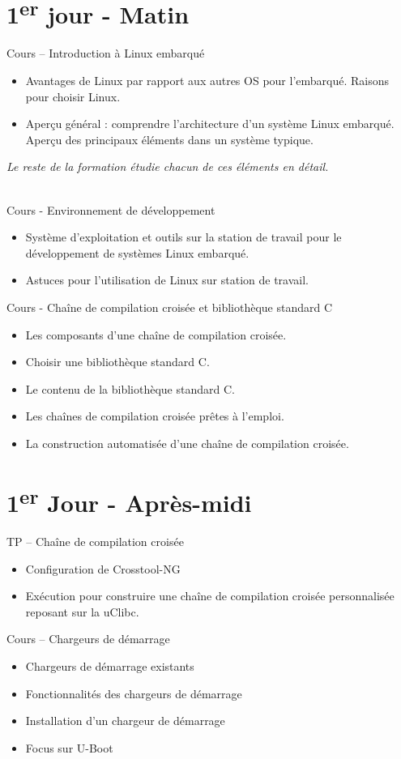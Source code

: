 \documentclass[a4paper,12pt,obeyspaces,spaces,hyphens]{article}
\begin{document}
\section{1\textsuperscript{er} jour - Matin}

\feagendaonecolumn
{Cours – Introduction à Linux embarqué}
{
  \begin{itemize}
  \item Avantages de Linux par rapport aux autres OS pour l'embarqué.
	Raisons pour choisir Linux.
  \item Aperçu général : comprendre l'architecture d'un système Linux
	embarqué. Aperçu des principaux éléments dans un système typique.
  \end{itemize}
  {\em Le reste de la formation étudie chacun de ces éléments en détail.}
}
\\
\feagendatwocolumn
{Cours - Environnement de développement}
{
  \begin{itemize}
  \item Système d'exploitation et outils sur la station de travail
	pour le développement de systèmes Linux embarqué.
  \item Astuces pour l'utilisation de Linux sur station de travail.
  \end{itemize}
}
{Cours - Chaîne de compilation croisée et bibliothèque standard C}
{
  \begin{itemize}
  \item Les composants d'une chaîne de compilation croisée.
  \item Choisir une bibliothèque standard C.
  \item Le contenu de la bibliothèque standard C.
  \item Les chaînes de compilation croisée prêtes à l'emploi.
  \item La construction automatisée d'une chaîne de compilation croisée.
  \end{itemize}
}

\section{1\textsuperscript{er} Jour - Après-midi}
\feagendatwocolumn
{TP – Chaîne de compilation croisée}
{
  \begin{itemize}
  \item Configuration de Crosstool-NG
  \item Exécution pour construire une chaîne de compilation croisée
	personnalisée reposant sur la uClibc.
  \end{itemize}
}
{Cours – Chargeurs de démarrage}
{
  \begin{itemize}
  \item Chargeurs de démarrage existants
  \item Fonctionnalités des chargeurs de démarrage
  \item Installation d'un chargeur de démarrage
  \item Focus sur U-Boot
  \end{itemize}
}
\\
\end{document}
